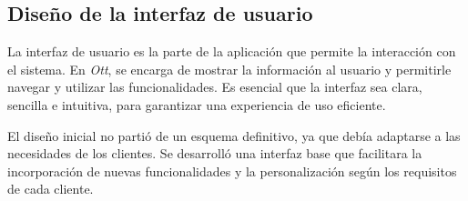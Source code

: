 
\subsection{Diseño de la interfaz de usuario}
\label{sec:diseno-ux-diseno}
La interfaz de usuario es la parte de la aplicación que permite la interacción con el sistema. En \textit{Ott}, 
se encarga de mostrar la información al usuario y permitirle navegar y utilizar las funcionalidades. 
Es esencial que la interfaz sea clara, sencilla e intuitiva, para garantizar una experiencia de uso eficiente.

El diseño inicial no partió de un esquema definitivo, ya que debía adaptarse a las necesidades de los clientes. 
Se desarrolló una interfaz base que facilitara la incorporación de nuevas funcionalidades y la personalización 
según los requisitos de cada cliente.

